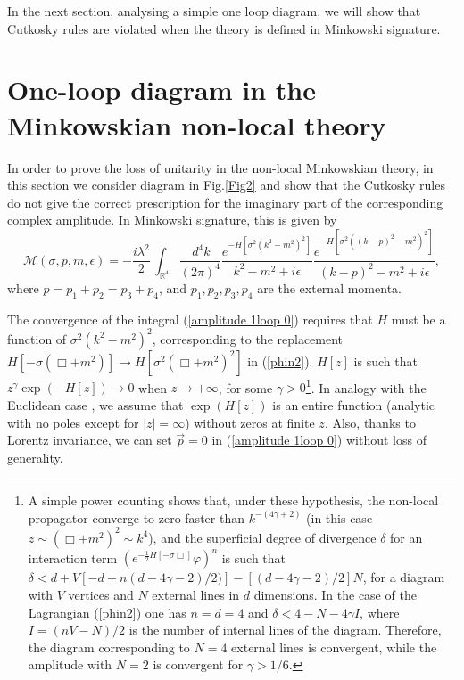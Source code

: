 \documentclass[a4paper,11pt]{article}
\begin{document}
In the next section, analysing a simple one loop diagram, we will show that Cutkosky rules are violated when the theory is defined in Minkowski signature.


\section{One-loop diagram in the Minkowskian non-local theory}\label{Section one loop Mink}









In order to prove the loss of unitarity in the non-local Minkowskian theory, in this section we consider  diagram in Fig.\ref{Fig2} and show that the  Cutkosky rules do not give the correct prescription for the imaginary part of the corresponding complex amplitude. In Minkowski signature, this is given by
%
\begin{equation}\label{amplitude 1loop 0}
\mathcal{M}(\sigma,p,m,\epsilon) = -  \frac{i \lambda^2}{2} \, \int_{
\mathbb{R}^4} \frac{ \, d^4 k}{(2\pi)^4}
\frac{e^{-H\left[\sigma^2\left(k^2-m^2\right)^2\right]}}{k^2 - m^2 + i \epsilon} \frac{e^{-H\left[\sigma^2\left(\left(k-p\right)^2-m^2\right)^2\right]}}{(k-p)^2 - m^2 + i \epsilon} ,
\end{equation}
where   $p = p_1+p_2=p_3+p_4$, and $p_1, p_2, p_3,p_4$ are the external momenta. 



The convergence of the integral (\ref{amplitude 1loop 0}) requires that $H$  must be a function of $\sigma^2 \left(k^2-m^2\right)^2$, corresponding to the replacement $H[-\sigma(\Box+m^2)]\rightarrow H[\sigma^2 (\Box+m^2)^2]$ in (\ref{phin2}). $H[z]$ is such that $z^\gamma \exp\left(-H\left[z\right]\right)\rightarrow 0$ when $z\rightarrow + \infty$, for some  $\gamma > 0$\footnote{A simple power counting shows that, under these hypothesis, the non-local propagator converge to zero faster than $k^{-(4\gamma+2)}$ (in this case $z\sim (\Box+m^2)^2 \sim k^4$), and the superficial degree of divergence $\delta$ for an interaction term $(e^{ - \frac{1}{2} H[- \sigma \Box] } \varphi )^n$ is such that \mbox{$\delta< d +V[-d+n (d-4\gamma-2)/2)]-[(d-4\gamma-2)/2]N$}, for a diagram with $V$ vertices and $N$ external lines in $d$ dimensions. In the case of the Lagrangian (\ref{phin2}) one has $n=d=4$ and $\delta < 4-N-4\gamma I$, where $I= (nV-N)/2$ is the number of internal lines of the diagram. Therefore, the diagram corresponding to $N=4$ external lines is convergent, while the amplitude with $N=2$  is convergent for $\gamma >1/6$.}. In analogy with the Euclidean case \cite{unitarity1,unitarity2,unitarity3}, we assume that $\exp\left(H[z]\right)$ is an entire function  (analytic with no poles except for $|z|=\infty$) without zeros at finite $z$.  Also, thanks to Lorentz invariance,  we can set $\vec{p}=0$ in (\ref{amplitude 1loop 0}) without loss of generality.
\end{document}

